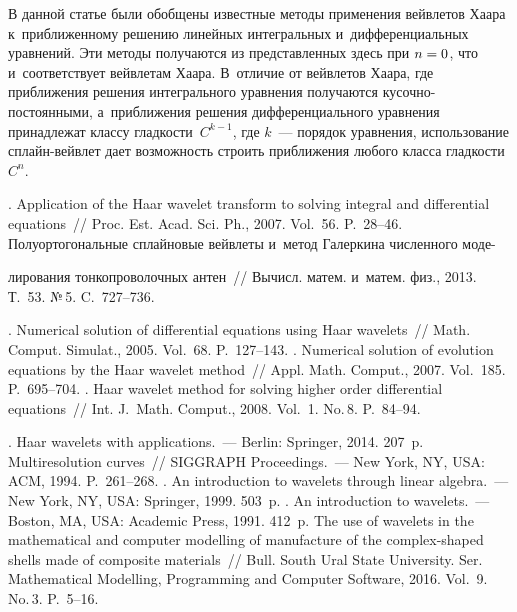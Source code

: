 \begin{multicols}{2}
В данной статье были обобщены известные методы применения вейвлетов 
Хаара к~приближенному решению линейных интегральных и~дифференциальных уравнений. 
Эти методы получаются из представленных здесь при $n\hm=0$, что и~соответствует 
вейвлетам Хаара. В~отличие от вейвлетов Хаара, где приближения решения интегрального 
уравнения получаются ку\-соч\-но-по\-сто\-ян\-ны\-ми, а~приближения решения 
дифференциального уравнения принадлежат классу глад\-кости~$C^{k-1}$, где $k$~--- 
порядок уравнения, использование сплайн-вейв\-лет дает возможность 
строить приближения любого класса гладкости~$C^n$.

\vspace*{-6pt}

{\small\frenchspacing
 {%
 \begin{thebibliography}{99}
 
 \vspace*{-2pt}
 
. 
Application of the Haar wavelet transform to solving integral and 
differential equations~// Proc. Est. Acad. Sci. Ph.,  2007. 
Vol.~56. P.~28--46.
 Полуортогональные сплайновые вейвлеты и~метод 
Галеркина численного моде-\linebreak\vspace*{-11pt}

\pagebreak

\noindent
лирования тонкопроволочных антен~// 
Вычисл. матем. и~матем. физ., 2013. Т.~53. №\,5. C.~727--736.

. 
Numerical solution of differential equations using Haar wavelets~//  
Math. Comput. Simulat., 2005. Vol.~68. P.~127--143.
. Numerical solution of evolution 
equations by the Haar wavelet method~//  Appl. Math. Comput., 2007.  Vol.~185. 
P.~695--704.
. Haar wavelet method for solving higher order
 differential equations~// Int. J.~Math. Comput., 2008. Vol.~1. No.\,8. P.~84--94.

.  Haar wavelets with applications.~---  
Berlin: Springer, 2014. 207~p.
 Multiresolution curves~// SIGGRAPH Proceedings.~--- 
New York, NY, USA: ACM, 1994. P.~261--268.
. An introduction to wavelets through linear algebra.~--- 
New York, NY, USA: Springer,  1999.  503~p.
.  An introduction to wavelets.~--- Boston, MA, USA: Academic Press, 1991. 412~p.
The use of wavelets in the mathematical and computer modelling of manufacture 
of the complex-shaped shells made of composite materials~//  Bull. 
South Ural State University. Ser. Mathematical Modelling, 
Programming and Computer Software, 2016. Vol.~9. No.\,3. P.~5--16.


\end{thebibliography}}}
\end{multicols}
